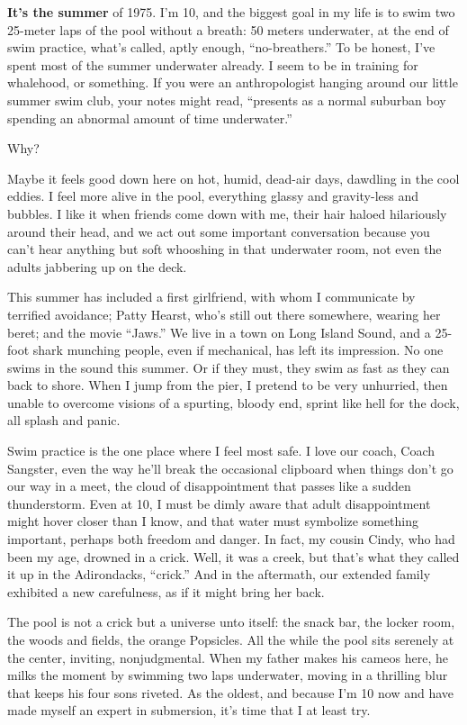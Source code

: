 \textbf{It's the summer} of 1975. I'm 10, and the biggest goal in my
life is to swim two 25-meter laps of the pool without a breath: 50
meters underwater, at the end of swim practice, what's called, aptly
enough, ``no-breathers.'' To be honest, I've spent most of the summer
underwater already. I seem to be in training for whalehood, or
something. If you were an anthropologist hanging around our little
summer swim club, your notes might read, ``presents as a normal suburban
boy spending an abnormal amount of time underwater.''

Why?

Maybe it feels good down here on hot, humid, dead-air days, dawdling in
the cool eddies. I feel more alive in the pool, everything glassy and
gravity-less and bubbles. I like it when friends come down with me,
their hair haloed hilariously around their head, and we act out some
important conversation because you can't hear anything but soft
whooshing in that underwater room, not even the adults jabbering up on
the deck.

This summer has included a first girlfriend, with whom I communicate by
terrified avoidance; Patty Hearst, who's still out there somewhere,
wearing her beret; and the movie ``Jaws.'' We live in a town on Long
Island Sound, and a 25-foot shark munching people, even if mechanical,
has left its impression. No one swims in the sound this summer. Or if
they must, they swim as fast as they can back to shore. When I jump from
the pier, I pretend to be very unhurried, then unable to overcome
visions of a spurting, bloody end, sprint like hell for the dock, all
splash and panic.

Swim practice is the one place where I feel most safe. I love our coach,
Coach Sangster, even the way he'll break the occasional clipboard when
things don't go our way in a meet, the cloud of disappointment that
passes like a sudden thunderstorm. Even at 10, I must be dimly aware
that adult disappointment might hover closer than I know, and that water
must symbolize something important, perhaps both freedom and danger. In
fact, my cousin Cindy, who had been my age, drowned in a crick. Well, it
was a creek, but that's what they called it up in the Adirondacks,
``crick.'' And in the aftermath, our extended family exhibited a new
carefulness, as if it might bring her back.

The pool is not a crick but a universe unto itself: the snack bar, the
locker room, the woods and fields, the orange Popsicles. All the while
the pool sits serenely at the center, inviting, nonjudgmental. When my
father makes his cameos here, he milks the moment by swimming two laps
underwater, moving in a thrilling blur that keeps his four sons riveted.
As the oldest, and because I'm 10 now and have made myself an expert in
submersion, it's time that I at least try.

